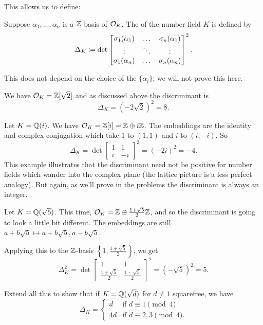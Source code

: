 This allows us to define:
\begin{definition}
	Suppose $\alpha_1, \dots, \alpha_n$ is a $\mathbb Z$-basis of $\mathcal O_K$.
	The  of the number field $K$ is defined by
	\[
	\Delta_K \coloneqq \det 
	\begin{bmatrix}
		\sigma_1(\alpha_1) & \dots & \sigma_n(\alpha_1) \\
		\vdots & \ddots & \vdots \\
		\sigma_1(\alpha_n) & \dots & \sigma_n(\alpha_n) \\
	\end{bmatrix}^2.
	\]
\end{definition}
This does not depend on the choice of the $\{\alpha_i\}$;
we will not prove this here.
\begin{example}[Discriminant of $K = \QQ(\sqrt2)$]
	We have $\mathcal O_K = \mathbb Z[\sqrt 2]$
	and as discussed above the discriminant is
	\[
		\Delta_K = 
		(-2 \sqrt 2)^2 = 8.
	\]
\end{example}
\begin{example}[Discriminant of $\QQ(i)$]
	Let $K = \mathbb Q(i)$.
	We have $\mathcal O_K = \mathbb Z[i] = \mathbb Z \oplus i \mathbb Z$.
	The embeddings are the identity and complex conjugation
	which take $1$ to $(1,1)$ and $i$ to $(i, -i)$.
	So
	\[
		\Delta_K = 
		\det 
		\begin{bmatrix}
			1 & 1 \\
			i & -i
		\end{bmatrix}^2
		=
		(-2i)^2 = -4.
	\]
	This example illustrates that the discriminant need not be positive
	for number fields which wander into the complex plane
	(the lattice picture is a less perfect analogy).
	But again, as we'll prove in the problems the discriminant is always
	an integer.
\end{example}
\begin{example}
	Let $K = \mathbb Q(\sqrt5)$.
	This time, $\mathcal O_K = \mathbb Z \oplus \frac{1+\sqrt5}{2} \mathbb Z$, and so the discriminant
	is going to look a little bit different.
	The embeddings are still $a+b\sqrt 5 \mapsto a+b\sqrt5, a-b\sqrt5$.

	Applying this to the $\mathbb Z$-basis $\left\{ 1, \frac{1+\sqrt5}{2} \right\}$, we get
	\[
		\Delta_K^2
		=
		\det
		\begin{bmatrix}
			1 & 1 \\
			\frac{1+\sqrt5}{2} & \frac{1-\sqrt5}{2}
		\end{bmatrix}^2
		= (-\sqrt 5)^2 = 5.
	\]
\end{example}
\begin{exercise}
	Extend all this to show that
	if $K = \mathbb Q(\sqrt d)$ for $d \neq 1$ squarefree, we have
	\[
		\Delta_K =
		\begin{cases}
			d & \text{if } d \equiv 1 \pmod 4 \\
			4d & \text{if } d \equiv 2, 3 \pmod 4.
		\end{cases}
	\]
\end{exercise}

